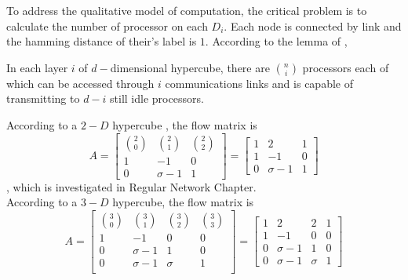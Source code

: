 To address the qualitative model of computation, the critical problem is to calculate the number of processor on each $D_{i}$.  Each node is connected by link and the hamming distance of their's label is $1$.  According to the lemma of \cite{blazewicz1995scheduling}, \\

\begin{lemma}
In each layer $i$ of $d-$dimensional hypercube, there are ${n \choose i}$ processors each of which can be accessed through $i$ communications links and is capable of transmitting to $d-i$ still idle processors.
\end{lemma}

According to a $2-D$ hypercube , the flow matrix is  
\begin{equation}
{
A = \left[ \begin{array}{ccc}
{2 \choose 0} & {2 \choose 1} & {2 \choose 2}\\
1 & -1 & 0\\
0 & \sigma-1 & 1
\end{array} 
\right ]
=
\left[ \begin{array}{ccc}
1 & 2 & 1\\
1 & -1 & 0\\
0 & \sigma-1 & 1
\end{array} 
\right ]
} 
\end{equation}
, which is investigated in Regular Network Chapter.\\

According to a $3-D$ hypercube, the flow matrix is \\

\begin{equation}
{
A = \left[ \begin{array}{cccc}
{3 \choose 0} & {3 \choose 1} & {3 \choose 2} & {3 \choose 3}\\
1 & -1 & 0 & 0\\
0 & \sigma-1 & 1 & 0\\
0 & \sigma-1 & \sigma & 1\\
\end{array} 
\right ]
=
\left[ \begin{array}{cccc}
1 & 2 & 2 & 1\\
1 & -1 & 0 & 0\\
0 & \sigma-1 & 1 & 0\\
0 & \sigma -1 & \sigma & 1
\end{array} 
\right ]
} 
\end{equation}
\\

